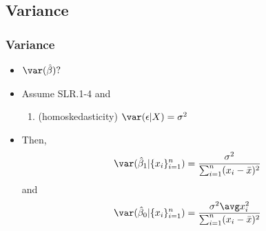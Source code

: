 \subsection{Variance}

\begin{frame}
  \frametitle{Variance}
  \begin{itemize}
  \item $\var(\hat{\beta})?$
  \item Assume SLR.1-4 and
    \begin{enumerate}
    \item[SLR.5]\label{s5} (homoskedasticity) $\var(\epsilon | X) =
      \sigma^2$
    \end{enumerate}
  \item Then, 
    \[ \var(\hat{\beta}_1 | \{x_i\}_{i=1}^n ) =
    \frac{\sigma^2}{\sum_{i=1}^n (x_i - \bar{x})^2} \]
    and 
    \[ \var(\hat{\beta}_0 | \{x_i\}_{i=1}^n ) =
    \frac{\sigma^2 \avg x_i^2 }{\sum_{i=1}^n (x_i - \bar{x})^2} \]
  \end{itemize}
\end{frame}

